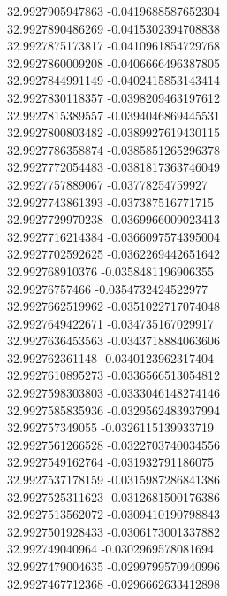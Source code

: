 {32.9927905947863	-0.0419688587652304\\
32.9927890486269	-0.0415302394708838\\
32.9927875173817	-0.0410961854729768\\
32.9927860009208	-0.0406666496387805\\
32.9927844991149	-0.0402415853143414\\
32.9927830118357	-0.0398209463197612\\
32.9927815389557	-0.0394046869445531\\
32.9927800803482	-0.0389927619430115\\
32.9927786358874	-0.0385851265296378\\
32.9927772054483	-0.0381817363746049\\
32.9927757889067	-0.03778254759927\\
32.9927743861393	-0.037387516771715\\
32.9927729970238	-0.0369966009023413\\
32.9927716214384	-0.0366097574395004\\
32.9927702592625	-0.0362269442651642\\
32.992768910376	-0.0358481196906355\\
32.99276757466	-0.0354732424522977\\
32.9927662519962	-0.0351022717074048\\
32.9927649422671	-0.034735167029917\\
32.9927636453563	-0.0343718884063606\\
32.992762361148	-0.0340123962317404\\
32.9927610895273	-0.0336566513054812\\
32.9927598303803	-0.0333046148274146\\
32.9927585835936	-0.0329562483937994\\
32.992757349055	-0.0326115139933719\\
32.9927561266528	-0.0322703740034556\\
32.9927549162764	-0.031932791186075\\
32.9927537178159	-0.0315987286841386\\
32.9927525311623	-0.0312681500176386\\
32.9927513562072	-0.0309410190798843\\
32.9927501928433	-0.0306173001337882\\
32.992749040964	-0.0302969578081694\\
32.9927479004635	-0.0299799570940996\\
32.9927467712368	-0.0296662633412898\\
}
